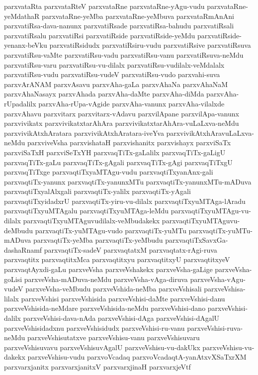 {parxvataRta
parxvataRteV
parxvataRne
parxvataRne-yAgu-vudu
parxvataRne-yeMdathaR
parxvataRne-yeMba
parxvataRne-yeMbuva
parxvataRmAnAni
parxvatiRsa-dava-nanunx
parxvatiRsade
parxvatiRsa-bahudu
parxvatiRsali
parxvatiRsalu
parxvatiRsi
parxvatiRside
parxvatiRside-yeMdu
parxvatiRside-yenanx-beVku
parxvatiRsidudx
parxvatiRsiru-vudu
parxvatiRsive
parxvatiRsuva
parxvatiRsu-vaMte
parxvatiRsu-vadu
parxvatiRsu-vanu
parxvatiRsuva-neMdu
parxvatiRsu-varu
parxvatiRsu-vu-dilalx
parxvatiRsu-vudilalx-veMdalalx
parxvatiRsu-vudu
parxvatiRsu-vudeV
parxvatiRsu-vudo
parxvahi-suva
parxvArANAM
parxvAsavu
parxvAha-gaLa
parxvAhaNa
parxvAhaNaM
parxvAhaNasayx
parxvAhada
parxvAha-daMte
parxvAha-diMda
parxvAha-rUpadalilx
parxvAha-rUpa-vAgide
parxvAha-vanunx
parxvAha-vilalxde
parxvAhavu
parxvitarx
parxvitarx-vAdavu
parxvilApane
parxvilApa-vanunx
parxvivikatx
parxvivikatxtarAhAra
parxvivikatxtarAhAra-vuLaLxva-neMdu
parxvivikAtxhAratara
parxvivikAtxhAratara-iveYva
parxvivikAtxhAravuLaLxva-neMdu
parxviveVsha
parxvishataH
parxvishanitx
parxvishayx
parxviSaTx
parxviSaTxH
parxviSeTxYH
parxvaqTiTx-gaLalilx
parxvaqTiTx-gaLigU
parxvaqTiTx-gaLu
parxvaqTiTx-gAgali
parxvaqTiTx-gAgi
parxvaqTiTxgU
parxvaqTiTxge
parxvaqtiTxyaMTAgu-vudu
parxvaqtiTxyanAnx-gali
parxvaqtiTx-yanunx
parxvaqtiTx-yanunxMTu
parxvaqtiTx-yanunxMTu-mADuva
parxvaqtiTxyalAlxgali
parxvaqtiTx-yalilx
parxvaqtiTx-yAgali
parxvaqtiTxyidadxrU
parxvaqtiTx-yiru-vu-dilalx
parxvaqtiTxyuMTAga-lAradu
parxvaqtiTxyuMTAgalu
parxvaqtiTxyuMTAga-leMdu
parxvaqtiTxyuMTAgu-vu-dilalx
parxvaqtiTxyuMTAguvudilalx-veMbudakekx
parxvaqtiTxyuMTAguvu-deMbudu
parxvaqtiTx-yuMTAgu-vudo
parxvaqtiTx-yuMTu
parxvaqtiTx-yuMTu-mADuva
parxvaqtiTx-yeMba
parxvaqtiTx-yeMbudu
parxvaqtiTxSavxGa-dashaRnamf
parxvaqtiTx-sadeV
parxvaqtatxM
parxvaqtatx-rAgi-ruva
parxvaqtitx
parxvaqtitxMca
parxvaqtitxyu
parxvaqtitxyU
parxvaqtitxyeV
parxvaqtAyxdi-gaLu
parxveVsha
parxveVshakekx
parxveVsha-gaLige
parxveVsha-goLisi
parxveVsha-mADuva-neMdu
parxveVsha-vAga-diruva
parxveVsha-vAgu-vudeV
parxveVsha-veMbudu
parxveVshida-neMba
parxveVshisali
parxveVshisa-lilalx
parxveVshisi
parxveVshisida
parxveVshisi-daMte
parxveVshisi-danu
parxveVshisida-neMdare
parxveVshisida-neMdu
parxveVshisi-dano
parxveVshisi-dalilx
parxveVshisi-dava-nAda
parxveVshisi-dAga
parxveVshisi-dAgalU
parxveVshisidadxnu
parxveVshisidudx
parxveVshisi-ru-vanu
parxveVshisi-ruva-neMdu
parxveVshisutatxve
parxveVshisu-vanu
parxveVshisuvaru
parxveVshisuvavu
parxveVshisuvAgalU
parxveVshisu-vu-dakUkx
parxveVshisu-vu-dakekx
parxveVshisu-vudu
parxvoVcadaq
parxvoVcadaqtA-yanAtxvXSaTxrXM
parxvarxjanitx
parxvarxjanitxV
parxvarxjinaH
parxvarxjeVtf
}
